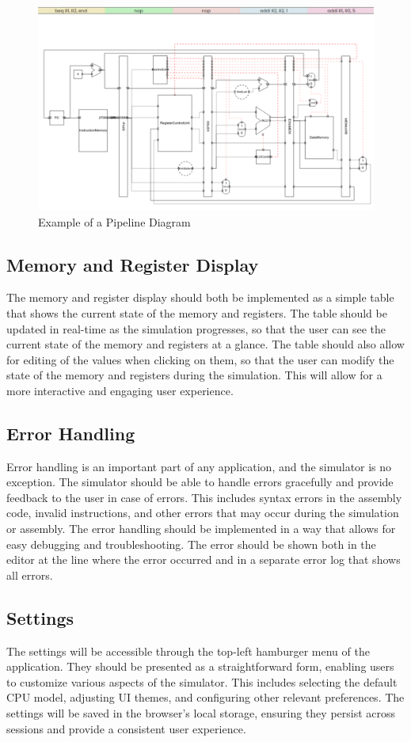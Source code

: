 \begin{figure}[H]
    \centering
    \includegraphics[width=1\textwidth]{assets/images/pipeline_diagram_example.png}
    \caption{Example of a Pipeline Diagram}
    \label{fig:pipeline_diagram_example}
\end{figure}

\subsection{Memory and Register Display}
The memory and register display should both be implemented as a simple table that shows the current state of the memory and registers. The table should be updated in real-time as the simulation progresses, so that the user can see the current state of the memory and registers at a glance. The table should also allow for editing of the values when clicking on them, so that the user can modify the state of the memory and registers during the simulation. This will allow for a more interactive and engaging user experience.

\subsection{Error Handling}
Error handling is an important part of any application, and the simulator is no exception. The simulator should be able to handle errors gracefully and provide feedback to the user in case of errors. This includes syntax errors in the assembly code, invalid instructions, and other errors that may occur during the simulation or assembly. The error handling should be implemented in a way that allows for easy debugging and troubleshooting. The error should be shown both in the editor at the line where the error occurred and in a separate error log that shows all errors.

\subsection{Settings}
The settings will be accessible through the top-left hamburger menu of the application. They should be presented as a straightforward form, enabling users to customize various aspects of the simulator. This includes selecting the default CPU model, adjusting UI themes, and configuring other relevant preferences. The settings will be saved in the browser's local storage, ensuring they persist across sessions and provide a consistent user experience.


